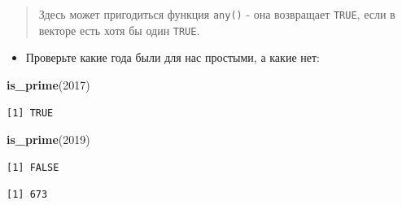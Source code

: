 \documentclass[
]{book}
\newenvironment{Shaded}{\begin{snugshade}}{\end{snugshade}}
\newcommand{\CommentTok}[1]{\textcolor[rgb]{0.56,0.35,0.01}{\textit{#1}}}
\newcommand{\ControlFlowTok}[1]{\textcolor[rgb]{0.13,0.29,0.53}{\textbf{#1}}}
\newcommand{\DecValTok}[1]{\textcolor[rgb]{0.00,0.00,0.81}{#1}}
\newcommand{\KeywordTok}[1]{\textcolor[rgb]{0.13,0.29,0.53}{\textbf{#1}}}
\newcommand{\NormalTok}[1]{#1}
\newcommand{\OperatorTok}[1]{\textcolor[rgb]{0.81,0.36,0.00}{\textbf{#1}}}
\newcommand{\StringTok}[1]{\textcolor[rgb]{0.31,0.60,0.02}{#1}}
\providecommand{\tightlist}{%
  \setlength{\itemsep}{0pt}\setlength{\parskip}{0pt}}
\begin{document}
\begin{quote}
Здесь может пригодиться функция \texttt{any()} - она возвращает \texttt{TRUE}, если в векторе есть хотя бы один \texttt{TRUE}.
\end{quote}

\begin{Shaded}
\end{Shaded}

\begin{itemize}
\tightlist
\item
  Проверьте какие года были для нас простыми, а какие нет:
\end{itemize}

\begin{Shaded}
\begin{Highlighting}[]
\KeywordTok{is_prime}\NormalTok{(}\DecValTok{2017}\NormalTok{)}
\end{Highlighting}
\end{Shaded}

\begin{verbatim}
[1] TRUE
\end{verbatim}

\begin{Shaded}
\begin{Highlighting}[]
\KeywordTok{is_prime}\NormalTok{(}\DecValTok{2019}\NormalTok{)}
\end{Highlighting}
\end{Shaded}

\begin{verbatim}
[1] FALSE
\end{verbatim}

\begin{Shaded}
\end{Shaded}

\begin{verbatim}
[1] 673
\end{verbatim}
\end{document}
